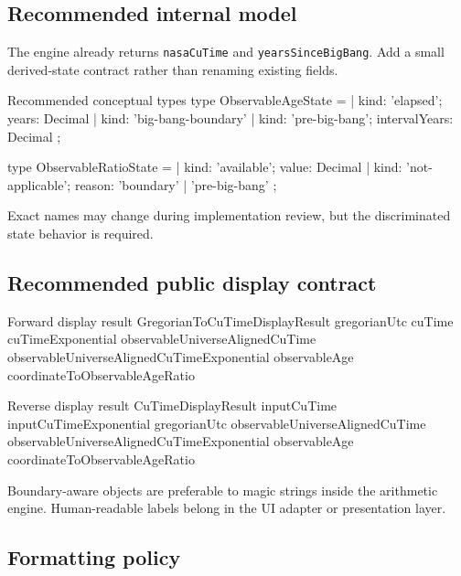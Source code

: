 \documentclass[11pt,letterpaper]{article}
\begin{document}
\subsection{Recommended internal model}

The engine already returns \texttt{nasaCuTime} and
\texttt{yearsSinceBigBang}. Add a small derived-state contract rather than
renaming existing fields.

\begin{codebox}{Recommended conceptual types}
type ObservableAgeState =
  | { kind: 'elapsed'; years: Decimal }
  | { kind: 'big-bang-boundary' }
  | { kind: 'pre-big-bang'; intervalYears: Decimal };

type ObservableRatioState =
  | { kind: 'available'; value: Decimal }
  | { kind: 'not-applicable'; reason: 'boundary' | 'pre-big-bang' };
\end{codebox}

Exact names may change during implementation review, but the discriminated
state behavior is required.

\subsection{Recommended public display contract}

\begin{codebox}{Forward display result}
GregorianToCuTimeDisplayResult {
  gregorianUtc
  cuTime
  cuTimeExponential
  observableUniverseAlignedCuTime
  observableUniverseAlignedCuTimeExponential
  observableAge
  coordinateToObservableAgeRatio
}
\end{codebox}

\begin{codebox}{Reverse display result}
CuTimeDisplayResult {
  inputCuTime
  inputCuTimeExponential
  gregorianUtc
  observableUniverseAlignedCuTime
  observableUniverseAlignedCuTimeExponential
  observableAge
  coordinateToObservableAgeRatio
}
\end{codebox}

Boundary-aware objects are preferable to magic strings inside the arithmetic
engine. Human-readable labels belong in the UI adapter or presentation layer.

\subsection{Formatting policy}
\end{document}

